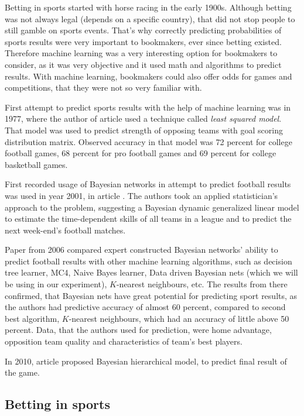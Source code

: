 \documentclass[conference]{IEEEtran}
\begin{document}
Betting in sports started with horse racing in the early 1900s. Although betting was 
not always legal (depends on a specific country), that did not stop people to still
gamble on sports events. That's why correctly predicting probabilities of sports 
results were very important to bookmakers, ever since betting existed. Therefore
machine learning was a very interesting option for bookmakers to consider, as it 
was very objective and it used math and algorithms to predict results. With machine learning, bookmakers 
could also offer odds for games and competitions, that they were not so very familiar 
with.

First attempt to predict sports results with the help of machine learning was in
1977, where the author of article \cite{Stefani_1977} used a technique called \textit{least squared model}.
That model was used to predict strength of opposing teams with goal scoring distribution matrix.
Observed accuracy in that model was 72 percent for college football games, 68 percent for pro 
football games and 69 percent for college basketball games.

First recorded usage of Bayesian networks in attempt to predict football results was used in
year 2001, in article \cite{Rue_2001}. The authors took an applied statistician's approach to the problem, 
suggesting a Bayesian dynamic generalized linear model to estimate the time-dependent 
skills of all teams in a league and to predict the next week-end's football matches.

Paper \cite{Joseph_2006} from 2006 compared expert constructed Bayesian networks' ability to 
predict football 
results with other machine learning algorithms, such as decision tree learner, MC4, Naive Bayes learner,
Data driven Bayesian nets (which we will be using in our experiment), $K$-nearest neighbours, etc. 
The results from there confirmed, that Bayesian nets have great potential for predicting sport
results, as the authors had predictive accuracy of almost 60 percent, compared to second best
algorithm, $K$-nearest neighbours, which had an accuracy of little above 50 percent. Data, that the authors 
used for prediction, were home advantage, opposition team quality and characteristics of team's best players.


In 2010, article \cite{Baio_2010} proposed Bayesian hierarchical model, to predict final result 
of the game.

\subsection{Betting in sports}
\end{document}
